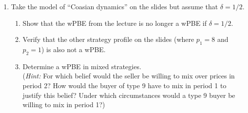 \documentclass[a4paper,12pt]{article}
\begin{document}
\begin{enumerate}
\item Take the model of ``Coasian dynamics'' on the slides but assume that $\delta=1/2$.
  \begin{enumerate}
  \item Show that the wPBE from the lecture is no longer a wPBE if $\delta=1/2$.
  \item Verify that the other strategy profile on the slides (where $p_1=8$ and $p_2=1$) is also not a wPBE.
  \item Determine a wPBE in mixed strategies.\\
    (\emph{Hint:} For which belief would the seller be willing to mix over prices in period 2? How would the buyer of type 9 have to mix in period 1 to justify this belief? Under which circumstances would a type 9 buyer be willing to mix in period 1?)
  \end{enumerate}
\end{enumerate}

\newpage


\end{document}
